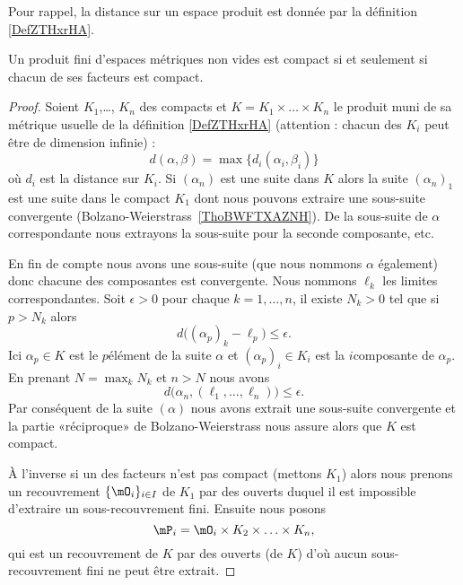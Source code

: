Pour rappel, la distance sur un espace produit est donnée par la définition \ref{DefZTHxrHA}.
\begin{theorem}\label{THOIYmxXuu}
	Un produit fini d'espaces métriques non vides est compact si et seulement si chacun de ses facteurs est compact.
\end{theorem}

\begin{proof}
	Soient \( K_1\),\ldots, \( K_n\) des compacts et \( K=K_1\times \ldots\times K_n\) le produit muni de sa métrique usuelle de la définition \eqref{DefZTHxrHA} (attention : chacun des \( K_i\) peut être de dimension infinie) :
	\begin{equation}
		d(\alpha,\beta)=\max\{ d_i(\alpha_i,\beta_i) \}
	\end{equation}
	où \( d_i\) est la distance sur \( K_i\). Si \( (\alpha_n)\) est une suite dans \( K\) alors la suite \( (\alpha_n)_1\) est une suite dans le compact \( K_1\) dont nous pouvons extraire une sous-suite convergente (Bolzano-Weierstrass~\ref{ThoBWFTXAZNH}). De la sous-suite de \( \alpha\) correspondante nous extrayons la sous-suite pour la seconde composante, etc.

	En fin de compte nous avons une sous-suite (que nous nommons \( \alpha\) également) donc chacune des composantes est convergente. Nous nommons \( \ell_k\) les limites correspondantes. Soit \( \epsilon>0\) pour chaque \( k=1,\ldots, n\), il existe \( N_k>0\) tel que si \( p>N_k\) alors
	\begin{equation}
		d\big( (\alpha_p)_k-\ell_p \big)\leq \epsilon.
	\end{equation}
	Ici \( \alpha_p\in K\) est le \( p\)\ieme élément de la suite \( \alpha\) et \( (\alpha_p)_i\in K_i\) est la \( i\)\ieme composante de \( \alpha_p\). En prenant \( N=\max_kN_k\) et \( n>N\) nous avons
	\begin{equation}
		d\big( \alpha_n,(\ell_1,\ldots, \ell_n) \big)\leq\epsilon.
	\end{equation}
	Par conséquent de la suite \( (\alpha)\) nous avons extrait une sous-suite convergente et la partie «réciproque» de Bolzano-Weierstrass nous assure alors que \( K\) est compact.

	À l'inverse si un des facteurs n'est pas compact (mettons \( K_1\)) alors nous prenons un recouvrement \( \{ \mO_i \}_{i\in I}\) de \( K_1\) par des ouverts duquel il est impossible d'extraire un sous-recouvrement fini. Ensuite nous posons
	\begin{equation}
		\mP_i=\mO_i\times K_2\times\ldots\times K_n,
	\end{equation}
	qui est un recouvrement de \( K\) par des ouverts (de \( K\)) d'où aucun sous-recouvrement fini ne peut être extrait.
\end{proof}

